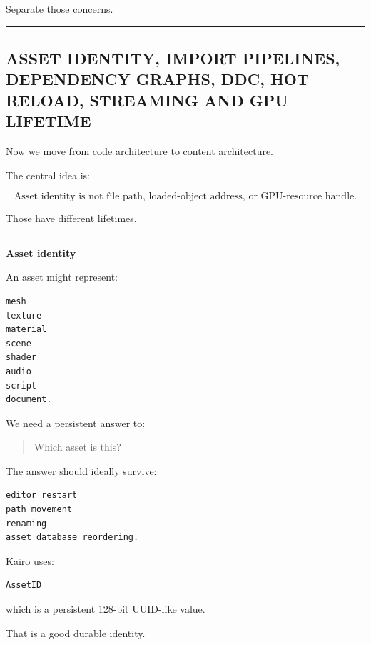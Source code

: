 Separate those concerns.

\begin{center}\rule{0.5\linewidth}{0.5pt}\end{center}

\subsection{ASSET IDENTITY, IMPORT PIPELINES, DEPENDENCY GRAPHS, DDC, HOT RELOAD, STREAMING AND GPU LIFETIME}\label{05-engine-i-ch010-asset-identity-import-pipelines-dependency-graphs-ddc-hot-reload-streaming-and-gpu-lifetime}

\hypertarget{05-engine-i-ch010-asset-identity-import-pipelines-dependency-graphs-ddc-hot-reload-streaming-and-gpu-lifetime}{}

Now we move from code architecture to content architecture.

The central idea is:

\[
\boxed{
\text{Asset identity is not file path,
loaded-object address,
or GPU-resource handle.}
}
\]

Those have different lifetimes.

\begin{center}\rule{0.5\linewidth}{0.5pt}\end{center}

\textbf{Asset identity}

An asset might represent:

\begin{verbatim}
mesh
texture
material
scene
shader
audio
script
document.
\end{verbatim}

We need a persistent answer to:

\begin{quote}
Which asset is this?
\end{quote}

The answer should ideally survive:

\begin{verbatim}
editor restart
path movement
renaming
asset database reordering.
\end{verbatim}

Kairo uses:

\begin{verbatim}
AssetID
\end{verbatim}

which is a persistent 128-bit UUID-like value.

That is a good durable identity.

